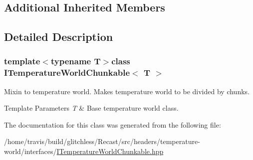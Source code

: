\subsection*{Additional Inherited Members}


\subsection{Detailed Description}
\subsubsection*{template$<$typename T$>$class I\-Temperature\-World\-Chunkable$<$ T $>$}

Mixin to temperature world. Makes temperature world to be divided by chunks.


\begin{DoxyTemplParams}{Template Parameters}
{\em T} & Base temperature world class. \\
\hline
\end{DoxyTemplParams}


The documentation for this class was generated from the following file\-:\begin{DoxyCompactItemize}
\item 
/home/travis/build/glitchless/\-Recast/src/headers/temperature-\/world/interfaces/\hyperlink{_i_temperature_world_chunkable_8hpp}{I\-Temperature\-World\-Chunkable.\-hpp}\end{DoxyCompactItemize}
